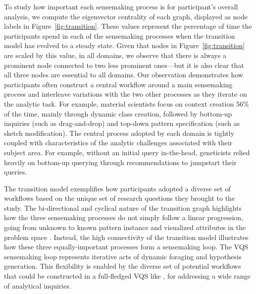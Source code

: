 \par To study how important each sensemaking process 
is for participant's overall analysis, 
we compute the eigenvector centrality of each graph, 
displayed as node labels in Figure~\ref{fig:transition}. 
These values represent the percentage of time the participants
spend in each of the sensemaking processes 
when the transition model has evolved to a steady state. 
Given that nodes in Figure~\ref{fig:transition} 
are scaled by this value, in all domains, 
we observe that there is always a prominent node 
connected to two less prominent ones---but it is also clear
that all three nodes are essential to all domains.
Our observation demonstrates how participants 
often construct a central workflow 
around a main sensemaking process 
and interleave variations with the two other processes 
as they iterate on the analytic task. 
For example, material scientists focus 
on context creation 56\% of the time, 
mainly through dynamic class creation, 
followed by bottom-up inquiries (such as drag-and-drop)
 and top-down pattern specification (such as sketch modification). 
The central process adopted by each domain 
is tightly coupled with characteristics 
of the analytic challenges associated with their subject area. 
For example, without an initial query in-the-head, 
geneticists relied heavily on bottom-up querying 
through recommendations to jumpstart their queries. 
\par The transition model exemplifies how participants 
adopted a diverse set of workflows 
based on the unique set of research questions they brought to the study. 
The bi-directional and cyclical nature 
of the transition graph highlights how the three sensemaking processes 
do not simply follow a linear progression, going from unknown to known pattern instance and visualized attributes in the problem space . 
Instead, the high connectivity of the transition model illustrates how these three equally-important processes form a sensemaking loop. 
The VQS sensemaking loop represents 
iterative acts of dynamic foraging and hypothesis generation. 
This flexibility is enabled by the diverse set of potential workflows 
that could be constructed in a full-fledged VQS like \zvpp, 
for addressing a wide range of analytical inquiries.%
